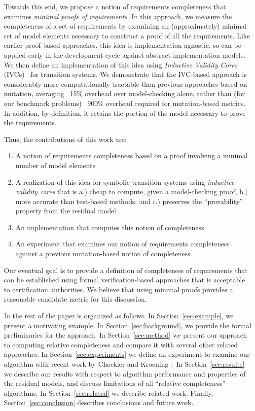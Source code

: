 \noindent Towards this end, we propose a notion of requirements completeness that examines {\em minimal proofs of requirements}.  In this approach, we measure the completeness of a set of requirements by examining an (approximately) minimal set of model elements necessary to construct a proof of all the requirements.  Like earlier proof-based approaches, this idea is implementation agnostic, so can be applied early in the development cycle against abstract implementation models.  We then define an implementation of this idea using {\em Inductive Validity Cores} (IVCs)~\cite{}  for transition systems.  We demonstrate that the IVC-based approach is considerably more computationally tractable than previous approaches based on mutation, averaging ~15\% overhead over model-checking alone, rather than (for our benchmark problems) ~900\% overhead required for mutation-based metrics.  In addition, by definition, it retains the portion of the model necessary to prove the requirements.

Thus, the contributions of this work are:
\begin{enumerate}
\item A notion of requirements completeness based on a proof involving a minimal number of model elements
\item A realization of this idea for symbolic transition systems using {\em inductive validity cores} that is a.) cheap to compute, given a model-checking proof, b.) more accurate than test-based methods, and c.) preserves the ``provability'' property from the residual model.
\item An implementation that computes this notion of completeness
\item An experiment that examines our notion of requirements completeness against a previous mutation-based notion of completeness.
\end{enumerate}

\noindent Our eventual goal is to provide a definition of completeness of requirements that can be established using formal verification-based approaches that is acceptable to certification authorities.  We believe that using minimal proofs provides a reasonable candidate metric for this discussion.


In the rest of the paper is organized as follows.  In Section~\ref{sec:example}, we present a motivating example.  In Section~\ref{sec:background}, we provide the formal preliminaries for the approach.  In Section~\ref{sec:method} we present our approach to computing relative completeness and compare it with several other related approaches.  In Section~\ref{sec:experiments} we define an experiment to examine our algorithm with recent work by Chockler and Kroening~\cite{chockler2010coverage}.  In Section~\ref{sec:results} we describe our results with respect to algorithm performance and properties of the residual models, and discuss limitations of all ``relative completeness'' algorithms.  In Section~\ref{sec:related} we describe related work.  Finally, Section~\ref{sec:conclusion} describes conclusions and future work.

